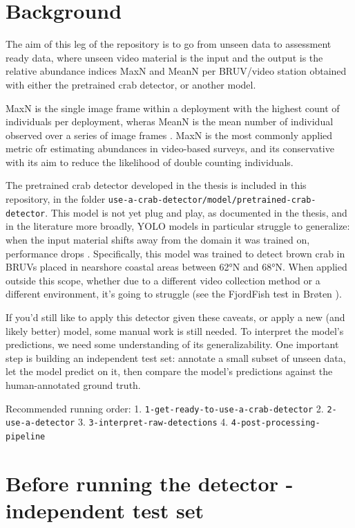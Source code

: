 \documentclass[
]{book}
\begin{document}
\section{Background}\label{background-1}

The aim of this leg of the repository is to go from unseen data to assessment ready data, where unseen video material is the input and the output is the relative abundance indices MaxN and MeanN per BRUV/video station obtained with either the pretrained crab detector, or another model.

MaxN is the single image frame within a deployment with the highest count of individuals per deployment, wheras MeanN is the mean number of individual observed over a series of image frames \citep{whitmarsh_what_2017}. MaxN is the most commonly applied metric ofr estimating abundances in video-based surveys, and its conservative with its aim to reduce the likelihood of double counting individuals.

The pretrained crab detector developed in the thesis is included in this repository, in the folder \texttt{use-a-crab-detector/model/pretrained-crab-detector}. This model is not yet plug and play, as documented in the thesis, and in the literature more broadly, YOLO models in particular struggle to generalize: when the input material shifts away from the domain it was trained on, performance drops \citep{lurig_computer_2021}. Specifically, this model was trained to detect brown crab in BRUVs placed in nearshore coastal areas between 62°N and 68°N. When applied outside this scope, whether due to a different video collection method or a different environment, it's going to struggle (see the FjordFish test in Brøten \citeyearpar{broten_crabs_2026}).

If you'd still like to apply this detector given these caveats, or apply a new (and likely better) model, some manual work is still needed. To interpret the model's predictions, we need some understanding of its generalizability. One important step is building an independent test set: annotate a small subset of unseen data, let the model predict on it, then compare the model's predictions against the human-annotated ground truth.

Recommended running order:
1. \texttt{1-get-ready-to-use-a-crab-detector}
2. \texttt{2-use-a-detector}
3. \texttt{3-interpret-raw-detections}
4. \texttt{4-post-processing-pipeline}

\section{Before running the detector - independent test set}\label{before-running-the-detector---independent-test-set}
\end{document}
